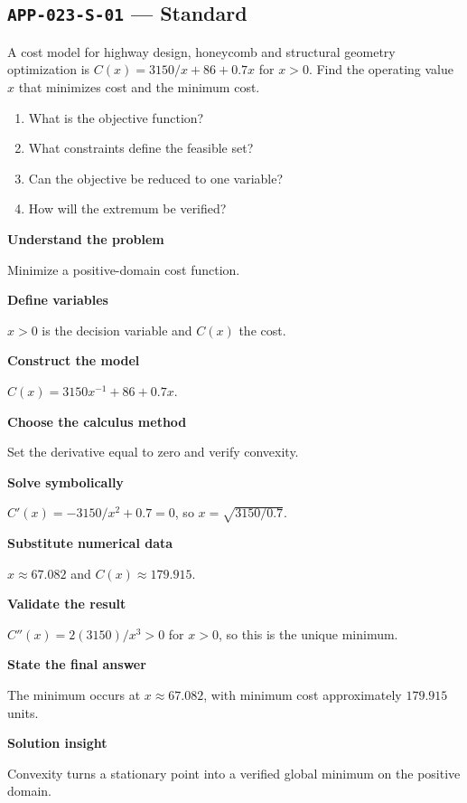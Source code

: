 \documentclass[11pt]{book}
\newcommand{\pid}[1]{\texttt{#1}}
\begin{document}
\subsection*{\pid{APP-023-S-01} — Standard}
\begin{problembox}
A cost model for highway design, honeycomb and structural geometry optimization is $C(x)=3150/x+86+0.7x$ for $x>0$. Find the operating value $x$ that minimizes cost and the minimum cost.
\end{problembox}
\begin{promptbox}\begin{enumerate}
\item What is the objective function?
\item What constraints define the feasible set?
\item Can the objective be reduced to one variable?
\item How will the extremum be verified?
\end{enumerate}\end{promptbox}
\begin{solutionbox}
\textbf{Understand the problem}\par Minimize a positive-domain cost function.\par\medskip
\textbf{Define variables}\par $x>0$ is the decision variable and $C(x)$ the cost.\par\medskip
\textbf{Construct the model}\par $C(x)=3150x^{-1}+86+0.7x$.\par\medskip
\textbf{Choose the calculus method}\par Set the derivative equal to zero and verify convexity.\par\medskip
\textbf{Solve symbolically}\par $C'(x)=-3150/x^2+0.7=0$, so $x=\sqrt{3150/0.7}$.\par\medskip
\textbf{Substitute numerical data}\par $x\approx 67.082$ and $C(x)\approx 179.915$.\par\medskip
\textbf{Validate the result}\par $C''(x)=2(3150)/x^3>0$ for $x>0$, so this is the unique minimum.\par\medskip
\textbf{State the final answer}\par The minimum occurs at $x\approx 67.082$, with minimum cost approximately $179.915$ units.\par\medskip
\textbf{Solution insight}\par Convexity turns a stationary point into a verified global minimum on the positive domain.\par\medskip
\end{solutionbox}
\end{document}
